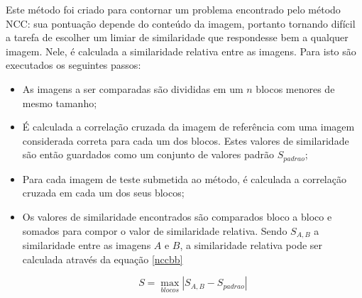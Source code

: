 Este método foi criado para contornar um problema encontrado pelo método NCC: sua pontuação depende do conteúdo da imagem, portanto tornando difícil a tarefa de escolher um limiar de similaridade que respondesse bem a qualquer imagem. Nele, é calculada a similaridade relativa entre as imagens.
Para isto são executados os seguintes passos:
\begin{itemize}
\item As imagens a ser comparadas são divididas em um $n$ blocos menores de mesmo tamanho;
\item É calculada a correlação cruzada da imagem de referência com uma imagem considerada correta para cada um dos blocos. Estes valores de similaridade são então guardados como um conjunto de valores padrão $S_{padrao}$;
\item Para cada imagem de teste submetida ao método, é calculada a correlação cruzada em cada um dos seus blocos;
\item Os valores de similaridade encontrados são comparados bloco a bloco e somados para compor o valor de similaridade relativa. Sendo $S_{A,B}$ a similaridade entre as imagens $A$ e $B$, a similaridade relativa pode ser calculada através da equação \ref{nccbb}

\begin{equation}
S = \max_{blocos}|S_{A,B} - S_{padrao}| \label{nccbb}
\end{equation}

\end{itemize}

